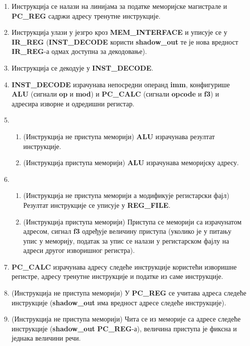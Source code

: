 \begin{enumerate}
	\item Инструкција се налази на линијама за податке меморијске магистрале и \textbf{PC\_REG} садржи адресу тренутне инструкције. \label{itemone}
	\item Инструкција улази у језгро кроз \textbf{MEM\_INTERFACE} и уписује се у \textbf{IR\_REG} (\textbf{INST\_DECODE} користи \textbf{shadow\_out} те је нова вредност \textbf{IR\_REG}-а одмах доступна за декодовање).
	\item Инструкција се декодује у \textbf{INST\_DECODE}.
	\item \textbf{INST\_DECODE} израчунава непосредни операнд \textbf{imm}, конфигурише \textbf{ALU} (сигнали \textbf{op} и \textbf{mod}) и \textbf{PC\_CALC} (сигнали \textbf{opcode} и \textbf{f3}) и адресира изворне и одредишни регистар.
	\item
	\begin{enumerate}	
	\item (Инструкција не приступа меморији) \textbf{ALU} израчунава резултат инструкције.
	\item (Инструкција приступа меморији) \textbf{ALU} израчунава меморијску адресу.
	\end{enumerate}
	\item
	\begin{enumerate}
	\item (Инструкција не приступа меморији а модификује регистарски фајл) Резултат инструкције се уписује у \textbf{REG\_FILE}.
	\item (Инструкција приступа меморији) Приступа се меморији са израчунатом адресом, сигнал \textbf{f3} одређује величину приступа (уколико је у питању упис у меморију, податак за упис се налази у регистарском фајлу на адреси другог изворишног регистра).
	\end{enumerate}
	\item \textbf{PC\_CALC} израчунава адресу следеће инструкције користећи изворишне регистре, адресу тренутне инструкције и податке из саме инструкције.
	\item (Инструкција не приступа меморији) У \textbf{PC\_REG} се учитава адреса следеће инструкције (\textbf{shadow\_out} има вредност адресе следеће инструкције).
	\item (Инструкција не приступа меморији) Чита се из меморије са адресе следеће инструкције (\textbf{shadow\_out} \textbf{PC\_REG}-а), величина приступа је фиксна и једнака величини речи.
\end{enumerate}

